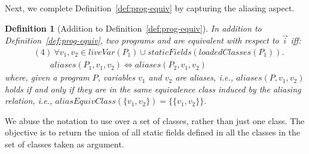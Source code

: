 \documentclass[conference]{IEEEtran}
\newtheorem{definition}{Definition}
\begin{document}
Next, we complete Definition~\ref{def:prog-equiv} by capturing the aliasing aspect.

\begin{definition}[Addition to Definition~\ref{def:prog-equiv}]\label{def:prog-equiv-add}
%
In addition to Definition~\ref{def:prog-equiv},
two programs  and  are equivalent
with respect to $\vec{i}$ iff:
\[
    \begin{aligned}
      & (4)~ \forall v_1,v_2 \in \mathit{liveVar}(P_1) \cup \mathit{staticFields}(loadedClasses(P_1)). \\
      & \qquad aliases(P_1, v_1, v_2) \Longleftrightarrow  aliases(P_2, v_1,v_2)      
    \end{aligned}
    \]
%
where, given a program $P$, variables $v_1$ and $v_2$ are aliases, i.e., $aliases(P, v_1, v_2)$ holds
if and only if they are in the same equivalence class induced by the aliasing relation,
  i.e., $aliasEquivClass(\allowbreak \{v_1,v_2\}) = \{\{v_1,v_2\}\}$.
%
\end{definition}

  We abuse the notation to use  over a set of classes, rather than just one class.
  The objective is to return the union of all static fields defined in all the classes in the set of classes taken as argument.





\end{document}

